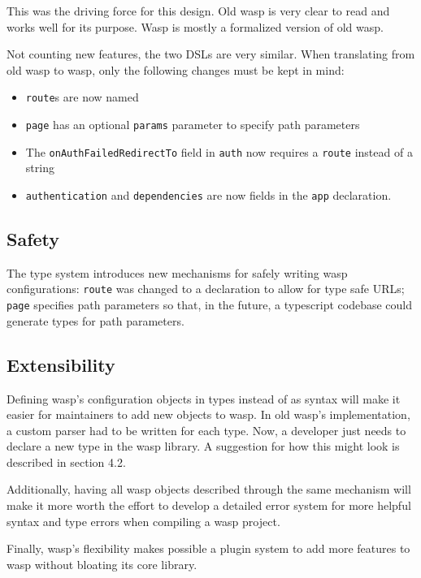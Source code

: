 This was the driving force for this design. Old wasp is very clear to read and
works well for its purpose. Wasp is mostly a formalized version of old wasp.

Not counting new features, the two DSLs are very similar. When translating
from old wasp to wasp, only the following changes must be kept in mind:

\begin{itemize}
  \item \texttt{route}s are now named
  \item \texttt{page} has an optional \texttt{params} parameter to specify
        path parameters
  \item The \texttt{onAuthFailedRedirectTo} field in \texttt{auth} now requires
        a \texttt{route} instead of a string
  \item \texttt{authentication} and \texttt{dependencies} are now fields in the
        \texttt{app} declaration.
\end{itemize}

\subsection{Safety}

The type system introduces new mechanisms for safely writing wasp
configurations: \texttt{route} was changed to a declaration to allow for
type safe URLs; \texttt{page} specifies path parameters so that, in the future,
a typescript codebase could generate types for path parameters.

\subsection{Extensibility}

Defining wasp's configuration objects in types instead of as syntax will make
it easier for maintainers to add new objects to wasp. In old wasp's
implementation, a custom parser had to be written for each type. Now, a
developer just needs to declare a new type in the wasp library. A suggestion
for how this might look is described in section 4.2.

Additionally, having all wasp objects described through the same mechanism will
make it more worth the effort to develop a detailed error system for more
helpful syntax and type errors when compiling a wasp project.

Finally, wasp's flexibility makes possible a plugin system to add more features
to wasp without bloating its core library.

